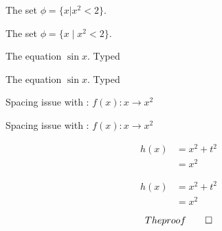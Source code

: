 \documentclass{sample}
\begin{document}
The set $\phi = \{ x | x^2 < 2\}$.

The set $\phi = \{ x \mid x^2 < 2\}$.

The equation $\sin x.$ Typed

The equation $\sin x$. Typed

Spacing issue with : $f(x) : x \to x^2$

Spacing issue with : $f(x) \colon x \to x^2$

\begin{align}
    h(x) &= x^2+t^2\\
    &= x^2
\end{align}

\begin{center}
\begin{align}
    h(x) &= x^2+t^2\\
    &= x^2
\end{align}
\end{center}

\[
    The proof \qed
\]
\end{document}
